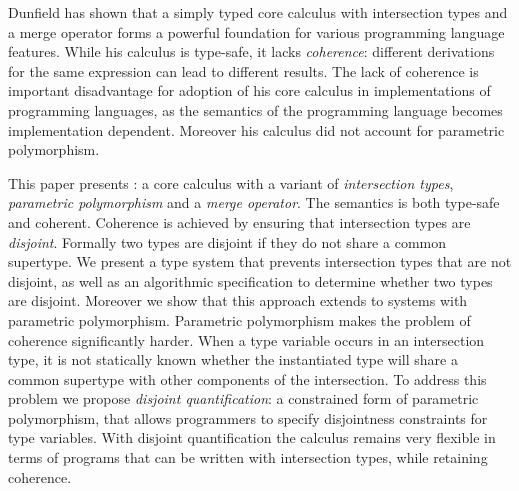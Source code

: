 Dunfield has shown that a simply typed core calculus with
intersection types and a merge operator forms a powerful foundation
for various programming language features. While his calculus
is type-safe, it lacks \emph{coherence}:
different derivations for the same expression can lead to different
results. The lack of coherence is important disadvantage for adoption
of his core calculus in implementations of programming languages, as
the semantics of the programming language becomes implementation
dependent. Moreover his calculus did not account for parametric polymorphism.

This paper presents \name: a core calculus with a variant of
\emph{intersection types}, \emph{parametric polymorphism} and a
\emph{merge operator}. The semantics \name is both type-safe and
coherent. Coherence is achieved by ensuring that intersection types
are \emph{disjoint}. Formally two types are disjoint if they do not
share a common supertype. We present a type system that prevents
intersection types that are not disjoint, as well as an algorithmic
specification to determine whether two types are disjoint. Moreover we
show that this approach extends to systems with parametric
polymorphism. Parametric polymorphism makes the problem of coherence
significantly harder. When a type variable occurs in an intersection
type, it is not statically known whether the instantiated type will
share a common supertype with other components of the intersection.
To address this problem we propose \emph{disjoint quantification}: a
constrained form of parametric polymorphism, that allows programmers
to specify disjointness constraints for type variables. With disjoint
quantification the calculus remains very flexible in terms of programs
that can be written with intersection types, while retaining coherence.
